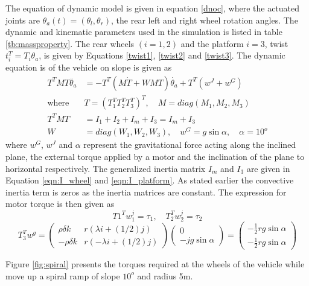 The equation of  dynamic model  is given in equation \ref{dnoc}, where the actuated joints are  $\theta_a(t)=(\theta_l, \theta_r) $, the rear left and right wheel rotation angles. The dynamic  and kinematic  parameters used in the simulation is listed in table \ref{tb:massproperty}. The rear wheels $(i=1,2)$ and the platform $i=3$, twist $t_i^T=T_i\theta_a$, is given by Equations \ref{twist1}, \ref{twist2} and \ref{twist3}. The dynamic equation is of the vehicle on slope is given as 
\begin{equation}
\label{dnoc}
\begin{aligned}
T^TMT\ddot{\theta_a}&=-T^T(M\dot{T}+WMT)\dot{\theta_a}+T^T(w^J+w^G)\\
\text{where} \quad &
T=(T_1^T T_2^T T_3^T)^T, \quad M=diag(M_1, M_2, M_3)\\
T^TMT &=I_1+I_2+I_m+I_3= I_m+I_3\\
W&=diag(W_1,W_2,W_3),\quad w^G=g\sin\alpha, \quad \alpha=10^o
\end{aligned}
\end{equation}
where $w^G$, $ w^J$ and $\alpha$ represent the gravitational force acting along the inclined plane,  the external torque applied by a motor and the inclination of the plane to horizontal respectively. The generalized inertia matrix $I_m$ and $I_3$ are given in Equation \ref{eqn:I_wheel} and \ref{eqn:I_platform}.
As stated earlier the convective inertia term is zeros as the inertia matrices are constant. The expression for motor torque  is then given as 
\begin{equation}
T1^Tw_1^j=\tau_1, \quad T_2^Tw_2^j=\tau_2
\end{equation}
\begin{equation}
 T_3^Tw^g=\begin{pmatrix}
\rho\delta k & r(\lambda i+(1/2)j) \\
 -\rho\delta k & r(-\lambda i+(1/2)j)
\end{pmatrix}
\begin{pmatrix}
0\\
-jg\sin\alpha
\end{pmatrix}=\begin{pmatrix}
-\frac{1}{2}rg\sin\alpha\\ -\frac{1}{2}rg\sin\alpha
\end{pmatrix}
\end{equation} 

Figure \ref{fig:spiral} presents the torques required at the wheels of the vehicle while move up a spiral ramp  of slope $10^o$ and radius 5m. 

